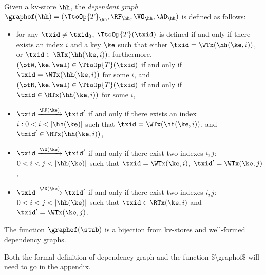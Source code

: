 \begin{definition}
Given a kv-store $\hh$, the \emph{dependent graph} $\graphof(\hh) = (\TtoOp{T}_{\hh}, \RF_{\hh}, 
\VO_{\hh}, \AD_{\hh})$ is defined as follows: 
\begin{itemize}
\item for any $\txid \neq \txid_0$, $\TtoOp{T}(\txid)$ is defined if and only if there exists an index $i$ and a key 
$\ke$ such that either $\txid = \WTx(\hh(\ke, i))$, or $\txid \in \RTx(\hh(\ke,i))$; furthermore, 
$(\otW, \ke, \val) \in \TtoOp{T}(\txid)$ if and only 
if $\txid = \WTx(\hh(\ke, i))$ for some $i$, and 
$(\otR, \ke, \val) \in \TtoOp{T}(\txid)$ if and only if $\txid \in \RTx(\hh(\ke, i))$ for some $i$, 
\item $\txid \xrightarrow{\RF(\ke)} \txid'$ if and only if there exists an index $i: 0 < i < \lvert \hh(\ke) \rvert$ 
such that $\txid = \WTx(\hh(\ke, i))$, and $\txid' \in \RTx(\hh(\ke, i))$, 
\item $\txid \xrightarrow{\VO(\ke)} \txid'$ if and only if there exist two indexes $i,j$: $0 < i < j < \lvert \hh(\ke) \rvert$ 
such that $\txid = \WTx(\ke, i)$, $\txid' = \WTx(\ke, j)$, 
\item $\txid \xrightarrow{\AD(\ke)} \txid'$ if and only if there exist two indexes $i,j$: $0 < i < j < \lvert \hh(\ke) \rvert$ 
such that $\txid \in \RTx(\ke, i)$ and $\txid' = \WTx(\ke, j)$.
\end{itemize}
\end{definition}

\begin{theorem}
The function $\graphof(\stub)$ is a bijection from kv-stores and well-formed dependency graphs.
\end{theorem}

\ac{Both the formal definition of dependency graph and the function $\graphof$ will need to go in the appendix.}

